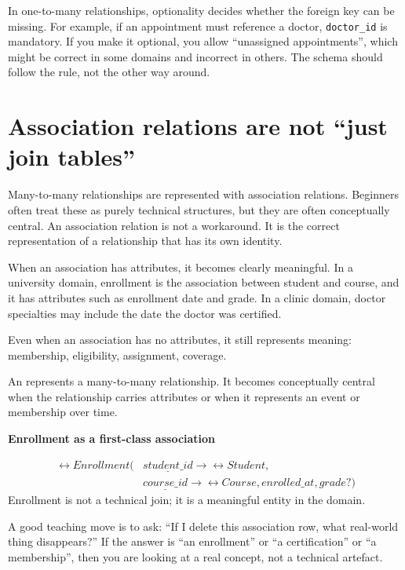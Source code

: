 In one-to-many relationships, optionality decides whether the foreign key can be missing.
For example, if an appointment must reference a doctor, \texttt{doctor\_id} is mandatory.
If you make it optional, you allow “unassigned appointments”, which might be correct in some domains and incorrect in others.
The schema should follow the rule, not the other way around.

\section{Association relations are not “just join tables”}
Many-to-many relationships are represented with association relations.
Beginners often treat these as purely technical structures, but they are often conceptually central.
An association relation is not a workaround.
It is the correct representation of a relationship that has its own identity.

When an association has attributes, it becomes clearly meaningful.
In a university domain, enrollment is the association between student and course, and it has attributes such as enrollment date and grade.
In a clinic domain, doctor specialties may include the date the doctor was certified.

Even when an association has no attributes, it still represents meaning: membership, eligibility, assignment, coverage.

\begin{definitionbox}
An  represents a many-to-many relationship.
It becomes conceptually central when the relationship carries attributes or when it represents an event or membership over time.
\end{definitionbox}

\begin{examplebox}
\textbf{Enrollment as a first-class association}\par\smallskip
\[
\begin{aligned}
\rel{Enrollment}(&\underline{student\_id} \rightarrow \rel{Student}, \\
&\underline{course\_id} \rightarrow \rel{Course}, enrolled\_at, grade?)
\end{aligned}
\]
Enrollment is not a technical join; it is a meaningful entity in the domain.
\end{examplebox}

A good teaching move is to ask: “If I delete this association row, what real-world thing disappears?”
If the answer is “an enrollment” or “a certification” or “a membership”, then you are looking at a real concept, not a technical artefact.

